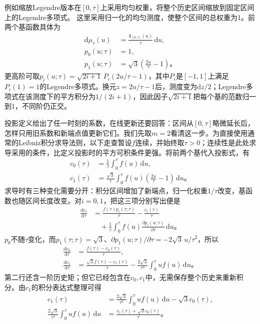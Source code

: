 例如缩放Legendre版本在$[0,\tau]$上采用均匀权重，将整个历史区间缩放到固定区间上的Legendre多项式。
这里采用归一化的均匀测度，使整个区间的总权重为1。前两个基函数具体为
\[
  \begin{aligned}
    \mathrm d\mu_\tau(u)
      &=\frac{\mathbf{1}_{[0,\tau]}(u)}{\tau}\,\mathrm du,\\
    p_0(u;\tau)&=1,\\
    p_1(u;\tau)&=\sqrt3\left(\frac{2u}{\tau}-1\right)\text{。}
  \end{aligned}
\]
更高阶可取$p_i(u;\tau)=\sqrt{2i+1}\,P_i(2u/\tau-1)$，其中$P_i$是$[-1,1]$上满足$P_i(1)=1$的Legendre多项式。换元$z=2u/\tau-1$后，测度变为$\mathrm dz/2$；Legendre多项式在该测度下的平方积分为$1/(2i+1)$，因此因子$\sqrt{2i+1}$把每个基的范数归一到1，不同阶仍正交。

投影定义给出了任一时刻的系数，在线更新还要回答：区间从$[0,\tau]$略微延长后，怎样只用旧系数和新端点值更新它们。我们先取$m=2$看清这一步。为直接使用通常的Leibniz积分求导法则，以下走查暂设$f$连续，并始终取$\tau>0$；连续性是此处求导采用的条件，比定义投影时的平方可积条件更强。将前两个基代入投影式，有
\[
  \begin{aligned}
    c_0(\tau)&=\frac1\tau\int_0^\tau f(u)\,\mathrm du,\\
    c_1(\tau)&=\frac{\sqrt3}{\tau}
      \int_0^\tau f(u)\left(\frac{2u}{\tau}-1\right)\,\mathrm du\text{。}
  \end{aligned}
\]
求导时有三种变化需要分开：积分区间增加了新端点，归一化权重$1/\tau$改变，基函数也随区间长度改变。对$i=0,1$，把这三项分别写出便是
\[
  \begin{aligned}
    \frac{\mathrm dc_i}{\mathrm d\tau}
      &=\frac{f(\tau)p_i(\tau;\tau)}{\tau}
        -\frac{c_i(\tau)}{\tau}\\
      &\quad+\frac1\tau\int_0^\tau
        f(u)\frac{\partial p_i(u;\tau)}{\partial\tau}\,\mathrm du\text{。}
  \end{aligned}
\]
$p_0$不随$\tau$变化，而$p_1(\tau;\tau)=\sqrt3$、$\partial p_1(u;\tau)/\partial\tau=-2\sqrt3\,u/\tau^2$，所以
\[
  \begin{aligned}
    \frac{\mathrm dc_0}{\mathrm d\tau}
      &=\frac{f(\tau)-c_0(\tau)}{\tau},\\
    \frac{\mathrm dc_1}{\mathrm d\tau}
      &=\frac{\sqrt3 f(\tau)-c_1(\tau)}{\tau}
        -\frac{2\sqrt3}{\tau^3}\int_0^\tau u f(u)\,\mathrm du\text{。}
  \end{aligned}
\]
第二行还含一阶历史矩；但它已经包含在$c_0,c_1$中，无需保存整个历史来重新积分。由$c_1$的积分表达式整理可得
\[
  \begin{aligned}
    c_1(\tau)
      &=\frac{2\sqrt3}{\tau^2}\int_0^\tau u f(u)\,\mathrm du
        -\sqrt3 c_0(\tau),\\
    \frac{2\sqrt3}{\tau^3}\int_0^\tau u f(u)\,\mathrm du
      &=\frac{c_1(\tau)+\sqrt3 c_0(\tau)}{\tau}\text{。}
  \end{aligned}
\]
